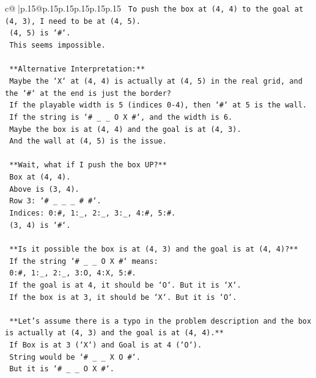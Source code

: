 \documentclass{article}
\begin{document}
{\begin{supertabular}{c@{$\;$}|p{.15\linewidth}@{}p{.15\linewidth}p{.15\linewidth}p{.15\linewidth}p{.15\linewidth}p{.15\linewidth}}
{{{\texttt{    To push the box at (4, 4) to the goal at (4, 3), I need to be at (4, 5).} \\
\texttt{    (4, 5) is `\#`.} \\
\texttt{    This seems impossible.} \\
\\ 
\texttt{    **Alternative Interpretation:**} \\
\texttt{    Maybe the `X` at (4, 4) is actually at (4, 5) in the real grid, and the `\#` at the end is just the border?} \\
\texttt{    If the playable width is 5 (indices 0{-}4), then `\#` at 5 is the wall.} \\
\texttt{    If the string is `\# \_ \_ O X \#`, and the width is 6.} \\
\texttt{    Maybe the box is at (4, 4) and the goal is at (4, 3).} \\
\texttt{    And the wall at (4, 5) is the issue.} \\
\\ 
\texttt{    **Wait, what if I push the box UP?**} \\
\texttt{    Box at (4, 4).} \\
\texttt{    Above is (3, 4).} \\
\texttt{    Row 3: `\# \_ \_ \_ \# \#`.} \\
\texttt{    Indices: 0:\#, 1:\_, 2:\_, 3:\_, 4:\#, 5:\#.} \\
\texttt{    (3, 4) is `\#`.} \\
\\ 
\texttt{    **Is it possible the box is at (4, 3) and the goal is at (4, 4)?**} \\
\texttt{    If the string `\# \_ \_ O X \#` means:} \\
\texttt{    0:\#, 1:\_, 2:\_, 3:O, 4:X, 5:\#.} \\
\texttt{    If the goal is at 4, it should be `O`. But it is `X`.} \\
\texttt{    If the box is at 3, it should be `X`. But it is `O`.} \\
\\ 
\texttt{    **Let's assume there is a typo in the problem description and the box is actually at (4, 3) and the goal is at (4, 4).**} \\
\texttt{    If Box is at 3 (`X`) and Goal is at 4 (`O`).} \\
\texttt{    String would be `\# \_ \_ X O \#`.} \\
\texttt{    But it is `\# \_ \_ O X \#`.} \\
}}}
\end{supertabular}}
\end{document}

